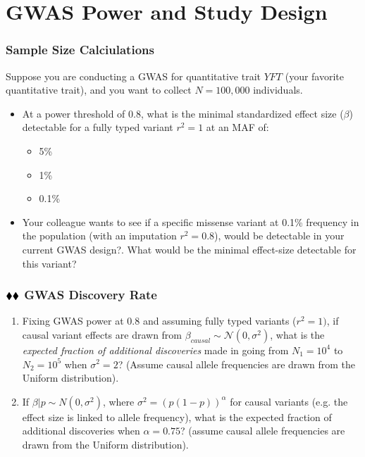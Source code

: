 \documentclass{pset}
\date{6/8/2025}
\begin{document}
\maketitle

\section*{GWAS Power and Study Design}

\subsubsection*{Sample Size Calciulations}

Suppose you are conducting a GWAS for quantitative trait $YFT$ (your favorite quantitative trait), and you want to collect $N=100,000$ individuals. 

\begin{itemize}
	\item At a power threshold of $0.8$, what is the minimal standardized effect size ($\beta$) detectable for a fully typed variant $r^2 = 1$ at an MAF of: 
	\begin{itemize}
		\item 5\% 
		\item 1\%
		\item 0.1\%
	\end{itemize}
	\item Your colleague wants to see if a specific missense variant at 0.1\% frequency in the population (with an imputation $r^2 = 0.8$), would be detectable in your current GWAS design?. What would be the minimal effect-size detectable for this variant?  
\end{itemize}

\subsubsection*{$\mathbin{\blacklozenge}\mathbin{\blacklozenge}$ GWAS Discovery Rate} 

\begin{enumerate}
\item Fixing GWAS power at $0.8$ and assuming fully typed variants ($r^2 = 1)$, if causal variant effects are drawn from $\beta_{causal} \sim \mathcal{N}(0,\sigma^2)$, what is the \textit{expected fraction of additional discoveries} made in going from $N_1 = 10^4$ to $N_2 = 10^5$ when $\sigma^2 = 2$? (Assume causal allele frequencies are drawn from the Uniform distribution). 
	
\item If $\beta | p \sim N(0, \sigma^2)$, where $\sigma^2 = \left(p(1-p)\right)^{\alpha}$ for causal variants (e.g. the effect size is linked to allele frequency), what is the expected fraction of additional discoveries when $\alpha = 0.75$? (assume causal allele frequencies are drawn from the Uniform distribution).
\end{enumerate}
\end{document}
